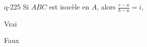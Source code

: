 \begin{truefalse}{q-225}
Si $ABC$ est isocèle en $A$, alors $\frac{c-a}{b-a} =i$,
\item Vrai
\item* Faux
\end{truefalse}

